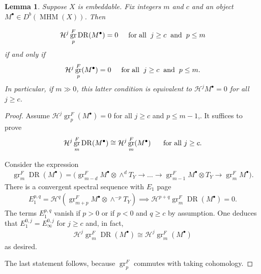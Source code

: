 \documentclass[11pt]{amsart}
\newtheorem{lemma}[equation]{Lemma}
\theoremstyle{definition}
\theoremstyle{plain}
\DeclareMathOperator{\gr}{gr}
\DeclareMathOperator{\MHM}{MHM}
\DeclareMathOperator{\dr}{DR}
\begin{document}
\begin{lemma}\label{lemma hodge-cohom 1}
Suppose $X$ is embeddable. Fix integers $m$ and $c$ and an object $M^\bullet \in D^b(\MHM(X))$. Then

\begin{align*}
    \mathcal{H}^{j} \gr_p^F \dr( M^\bullet) = 0 \hspace{.5cm} \mathrm{for} \hspace{.1cm} \mathrm{all} \hspace{.2cm} j \geq c \hspace{.2cm} \mathrm{and} \hspace{.2cm} p \leq m
\end{align*}
if and only if
\begin{align*}
    \mathcal{H}^{j} \gr_p^F (M^\bullet) = 0 \hspace{.5cm} \mathrm{for} \hspace{.1cm} \mathrm{all} \hspace{.2cm} j \geq c \hspace{.2cm} \mathrm{and} \hspace{.2cm} p \leq m.
\end{align*}
In particular, if $m \gg 0$, this latter condition is equivalent to $\mathcal{H}^j M^\bullet = 0$ for all $j \geq c$.
\end{lemma}


\begin{proof}
Assume $\mathcal{H}^j \gr_p^F (M^\bullet) = 0$ for all $j \geq c$ and $p \leq m - 1$,. It suffices to prove
\begin{align*}
    \mathcal{H}^{j} \gr_m^F \dr( M^\bullet) \cong \mathcal{H}^{j} \gr_m^F ( M^\bullet) \hspace{.5cm} \text{ for all } j \geq c.
\end{align*}

Consider the expression
\begin{align*}
    \gr_{m}^F \dr(M^\bullet) = \big( \gr_{m-d}^F M^\bullet \otimes \wedge^d T_Y \rightarrow \ldots \rightarrow \gr_{m-1}^F M^\bullet \otimes T_Y \rightarrow \gr_{m}^F M^\bullet \big).
\end{align*}
There is a convergent spectral sequence with $E_1$ page
\begin{align*}
    E_1^{p,q} = \mathcal{H}^{q}(\gr_{m+p}^F M^\bullet \otimes \wedge^{-p} T_Y  ) \implies \mathcal{H}^{p+q} \gr_m^F \dr(M^\bullet) = 0.
\end{align*}
The terms $E_1^{p,q}$ vanish if $p> 0$ or if $p < 0$ and $q \geq c$ by assumption. One deduces that $E_1^{0,j} = E_\infty^{0,j}$ for $j \geq c$ and, in fact,
\begin{align*}
    \mathcal{H}^{j} \gr_m^F \dr( M^\bullet) \cong \mathcal{H}^{j} \gr_m^F ( M^\bullet)
\end{align*}
as desired.

The last statement follows, because $\gr_p^F$ commutes with taking cohomology.
\end{proof}
\end{document}
